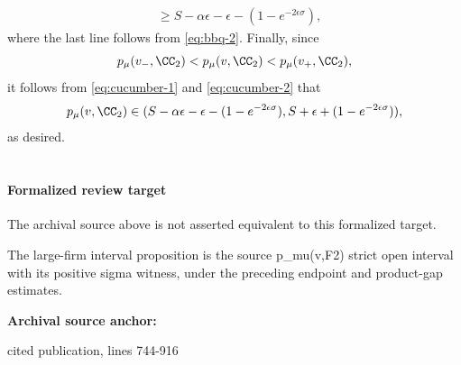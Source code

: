 \documentclass[10pt]{article}
\begin{document}
\begin{ReviewVerbatim}
\begin{align}
    &\ge S - \alpha\epsilon - \epsilon - (1 - e^{-2\epsilon\sigma}),\label{eq:cucumber-2}
\end{align}
where the last line follows from \eqref{eq:bbq-2}.
Finally, since
\begin{equation}
    p_\mu(v_-, \CC_2) < p_\mu(v, \CC_2) < p_\mu(v_+, \CC_2),
\end{equation}
it follows from \eqref{eq:cucumber-1} and \eqref{eq:cucumber-2} that
\begin{equation}
    p_\mu(v, \CC_2) \in (S - \alpha\epsilon - \epsilon - (1 - e^{-2\epsilon\sigma}), S + \epsilon + (1 - e^{-2\epsilon\sigma})),
\end{equation}
as desired.
\\
\\
\end{ReviewVerbatim}


\paragraph{Formalized review target}
The archival source above is not asserted equivalent to this formalized target.
\begin{ReviewVerbatim}
The large-firm interval proposition is the source p_mu(v,F2) strict open interval with its positive sigma witness, under the preceding endpoint and product-gap estimates.
\end{ReviewVerbatim}

\textbf{Archival source anchor:} {\footnotesize\raggedright cited publication, lines 744-\allowbreak{}916\par}
\end{document}
